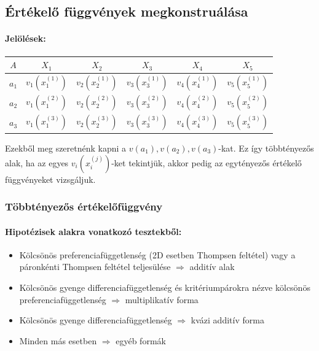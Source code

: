 \documentclass[a4paper,12pt]{article}
\begin{document}
\subsection{Értékelő függvények megkonstruálása}

\paragraph{Jelölések:}

\begin{center}
\begin{tabular}{c||c|c|c|c|c}
 $A$ & $X_1$& $X_2$& $X_3$& $X_4$& $X_5$ \\
 \hline
 $a_1$&$v_1(x^{(1)}_{1})$  &$v_2(x^{(1)}_{2})$ & $v_3(x^{(1)}_{3})$ & $v_4(x^{(1)}_{4})$& $v_5(x^{(1)}_{5})$ \\
 $a_2$&$v_1(x^{(2)}_{1})$  &$v_2(x^{(2)}_{2})$ & $v_3(x^{(2)}_{3})$ & $v_4(x^{(2)}_{4})$& $v_5(x^{(2)}_{5})$ \\
 $a_3$&$v_1(x^{(3)}_{1})$  &$v_2(x^{(3)}_{2})$ & $v_3(x^{(3)}_{3})$ & $v_4(x^{(3)}_{4})$& $v_5(x^{(3)}_{5})$ \\
\end{tabular}
\end{center}
Ezekből meg szeretnénk kapni a $v(a_1), v(a_2), v(a_3)$-kat. Ez így többtényezős alak, ha az egyes $v_i(x^{(j)}_{i})$-ket tekintjük, akkor pedig az egytényezős értékelő függvényeket vizsgáljuk.

\subsubsection{Többtényezős értékelőfüggvény}

\paragraph{Hipotézisek alakra vonatkozó tesztekből:} 

\begin{itemize}
\item Kölcsönös preferenciafüggetlenség (2D esetben Thompsen feltétel) vagy a páronkénti Thompsen feltétel teljesülése $\Rightarrow$ additív alak
\item Kölcsönös gyenge differenciafüggetlenség és kritériumpárokra nézve kölcsönös preferenciafüggetlenség  $\Rightarrow$ multiplikatív forma
\item  Kölcsönös gyenge differenciafüggetlenség $\Rightarrow$ kvázi additív forma
\item Minden más esetben  $\Rightarrow$ egyéb formák

\end{itemize}
\end{document}
